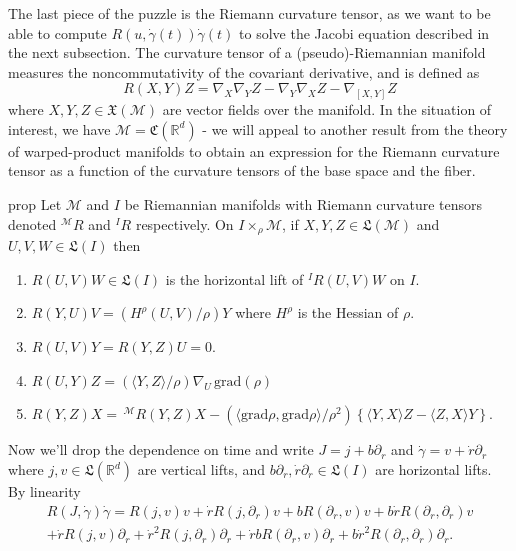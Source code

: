 \documentclass{article}
\newcommand{\man}{\mathcal{M}}
\begin{document}
The last piece of the puzzle is the Riemann curvature tensor, as we want to be able to compute $R(u, \dot\gamma(t))\dot\gamma(t)$ to solve the Jacobi equation described in the next subsection. The curvature tensor of a (pseudo)-Riemannian manifold measures the noncommutativity of the covariant derivative, and is defined as
\begin{equation}
    R(X,Y)Z = \nabla_X \nabla_YZ - \nabla_Y\nabla_XZ - \nabla_{[X,Y]}Z
\end{equation}
where $X,Y, Z \in \mathfrak{X}(\man)$ are vector fields over the manifold. In the situation of interest, we have $\man = \mathfrak{C}(\mathbb{R}^d)$ - we will appeal to another result from the theory of warped-product manifolds to obtain an expression for the Riemann curvature tensor as a function of the curvature tensors of the base space and the fiber. 
\begin{restatable}{prop}{} \label{prop: warped product curvature tensor}
      Let $\man$ and $I$ be Riemannian manifolds with Riemann curvature tensors denoted $^{\man}R$ and $^IR$ respectively. On $I \times_\rho \man$, if $X, Y, Z \in \mathfrak{L}(\man)$ and $U, V, W \in \mathfrak{L}(I)$ then
    \begin{enumerate}
        \item $R(U, V)W \in \mathfrak{L}(I)$ is the horizontal lift of $^IR(U,V)W$ on $I$.
        \item $R(Y,U)V = (H^\rho(U,V)/\rho)Y$ where $H^\rho$ is the Hessian of $\rho$.
        \item $R(U,V)Y = R(Y,Z)U = 0.$
        \item $R(U,Y)Z = (\langle Y,Z\rangle/\rho)\nabla_U\,\text{grad}(\rho)$\item $R(Y,Z)X = \,^\man R(Y,Z)X - (\langle \text{grad}\rho, \text{grad}\rho\rangle/\rho^2)\left\{\langle Y,X \rangle  Z - \langle Z, X\rangle Y\right\}.$
    \end{enumerate}
\end{restatable}
Now we'll drop the dependence on time and write $J = j +  b\partial_r$ and $\dot\gamma = v +  \dot r\partial_r$ where $j, v \in \mathfrak{L}(\mathbb{R}^d)$ are vertical lifts, and $b\partial_r,\dot r\partial_r \in \mathfrak{L}(I)$ are horizontal lifts. By linearity
\begin{multline}
    R(J, \dot\gamma)\dot\gamma = R(j, v)v + \dot rR(j, \partial_r)v + bR(\partial_r, v)v + b\dot rR(\partial_r, \partial_r)v \\
    + \dot rR(j, v)\partial_r + \dot r^2R(j, \partial_r)\partial_r + \dot rbR(\partial_r, v)\partial_r + b\dot r^2R(\partial_r, \partial_r)\partial_r.
\end{multline}
\end{document}
